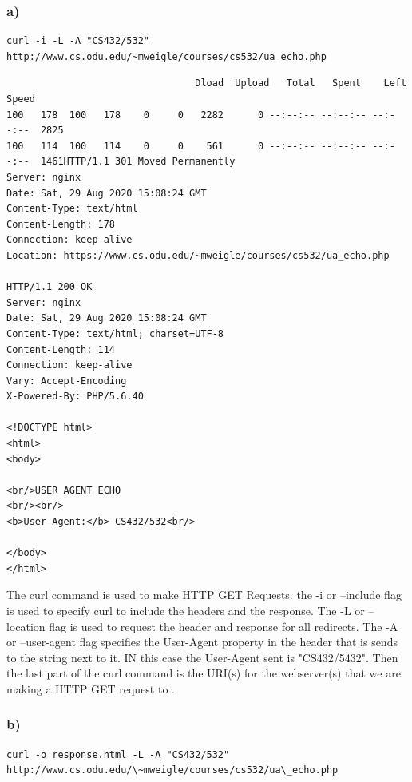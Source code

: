 \documentclass[12pt]{article}
\begin{document}
\subsubsection*{a)}
\begin{lstlisting}[numbers=none, caption=Command, label=lst:q2ACommand]
curl -i -L -A "CS432/532" http://www.cs.odu.edu/~mweigle/courses/cs532/ua_echo.php
\end{lstlisting}
\begin{lstlisting}[numbers=none,
		        caption={curl command to get the GET response and header, redirects and send a User-Agent header propety}, 
			label=lst:q2AResponse]
  % Total    % Received % Xferd  Average Speed   Time    Time     Time  Current
                                 Dload  Upload   Total   Spent    Left  Speed
100   178  100   178    0     0   2282      0 --:--:-- --:--:-- --:--:--  2825
100   114  100   114    0     0    561      0 --:--:-- --:--:-- --:--:--  1461HTTP/1.1 301 Moved Permanently
Server: nginx
Date: Sat, 29 Aug 2020 15:08:24 GMT
Content-Type: text/html
Content-Length: 178
Connection: keep-alive
Location: https://www.cs.odu.edu/~mweigle/courses/cs532/ua_echo.php

HTTP/1.1 200 OK
Server: nginx
Date: Sat, 29 Aug 2020 15:08:24 GMT
Content-Type: text/html; charset=UTF-8
Content-Length: 114
Connection: keep-alive
Vary: Accept-Encoding
X-Powered-By: PHP/5.6.40

<!DOCTYPE html>
<html>
<body>

<br/>USER AGENT ECHO
<br/><br/>
<b>User-Agent:</b> CS432/532<br/>

</body>
</html>
\end{lstlisting}

The curl command is used to make HTTP GET Requests. the -i  or --include flag is used to specify curl to include the headers and the response. The -L or --location flag is used to request the header 
and response for all redirects. The -A or --user-agent flag specifies the User-Agent property in the header that is sends to the string next to it. IN this case the User-Agent sent is "CS432/5432".
Then the last part of the curl command is the URI(s) for the webserver(s) that we are making a HTTP GET request to \cite{curlManPage}.

\subsubsection*{b)}
\begin{lstlisting}[numbers=none, caption="curl command to get headers only for all redirects and sets the User-Agent header property", label=lst:q2BCommand]
curl -o response.html -L -A "CS432/532" http://www.cs.odu.edu/\~mweigle/courses/cs532/ua\_echo.php
\end{lstlisting}
\end{document}
